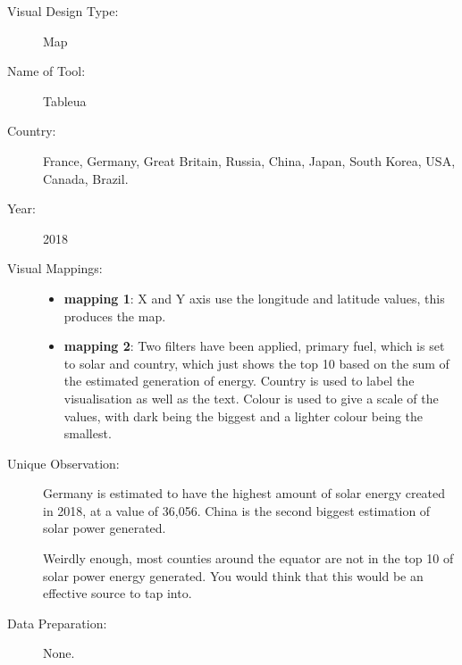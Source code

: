 \begin{description}
\item[Visual Design Type:]
Map
\item[Name of Tool:]
Tableua
\item[Country:]
France, Germany, Great Britain, Russia, China, Japan, South Korea, USA, Canada, Brazil.
\item[Year:]
2018
\item[Visual Mappings:]
\begin{itemize}
\tightlist
\item
  \textbf{mapping 1}: X and Y axis use the longitude and latitude values, this produces the map.
\end{itemize}

\begin{itemize}
\tightlist
\item
  \textbf{mapping 2}: Two filters have been applied, primary fuel, which is set to solar and country, which just shows the top 10 based on the sum of the estimated generation of energy. 
  Country is used to label the visualisation as well as the text. Colour is used to give a scale of the values, with dark being the biggest and a lighter colour being the smallest.
\end{itemize}
\item[Unique Observation:]
Germany is estimated to have the highest amount of solar energy created in 2018, at a value of 36,056. China is the second biggest estimation of solar power generated.

Weirdly enough, most counties around the equator are not in the top 10 of solar power energy generated. You would think that this would be an effective source to tap into.

\item[Data Preparation:]
None.
\end{description}  